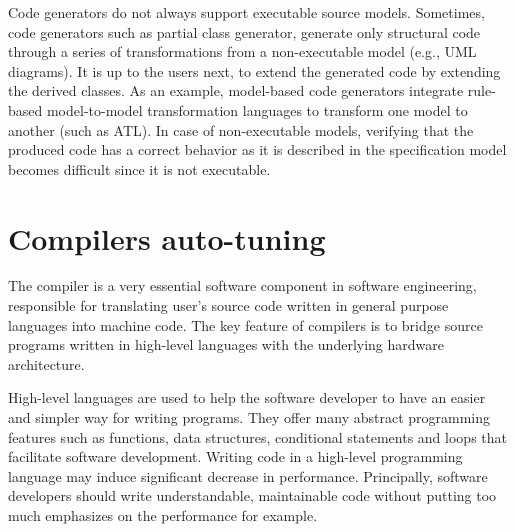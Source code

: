 \begin{itemize}
	Code generators do not always support executable source models. Sometimes, code generators such as partial class generator, generate only structural code through a series of transformations from a non-executable model (e.g., UML diagrams). It is up to the users next, to extend the generated code by extending the derived classes. 
	As an example, model-based code generators integrate rule-based model-to-model transformation languages to transform one model to another (such as ATL).
	In case of non-executable models, verifying that the produced code has a correct behavior as it is described in the specification model becomes difficult since it is not executable.
	   

	
\end{itemize}






\section{Compilers auto-tuning}
\label{bg:Compilers auto-tuning}
The compiler is a very essential software component in software engineering, responsible for translating user's source code written in general purpose languages into machine code. The key feature of compilers is to bridge source programs written in high-level languages with the underlying hardware architecture.

High-level languages are used to help the software developer to have an easier and simpler way for writing programs. They offer many abstract programming features such as functions, data structures, conditional statements and loops that facilitate software development.
Writing code in a high-level programming language may induce significant decrease in performance. Principally, software developers should write understandable, maintainable code without putting too much emphasizes on the performance for example. 

